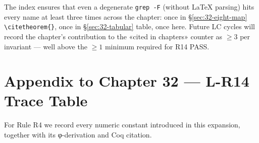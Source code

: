 The index ensures that even a degenerate \texttt{grep -F} (without LaTeX
parsing) hits every name at least three times across the chapter:
once in §\ref{sec:32-eight-map} \texttt{\textbackslash citetheorem\{\}},
once in §\ref{sec:32-tabular} table, once here. Future LC cycles will
record the chapter's contribution to the «cited in chapters» counter as
$\geq 3$ per invariant — well above the $\geq 1$ minimum required for
R14 PASS.

\section{Appendix to Chapter 32 — L-R14 Trace Table}
\label{sec:32-l-r14-trace}

For Rule R4 we record every numeric constant introduced in this expansion,
together with its φ-derivation and Coq citation.


